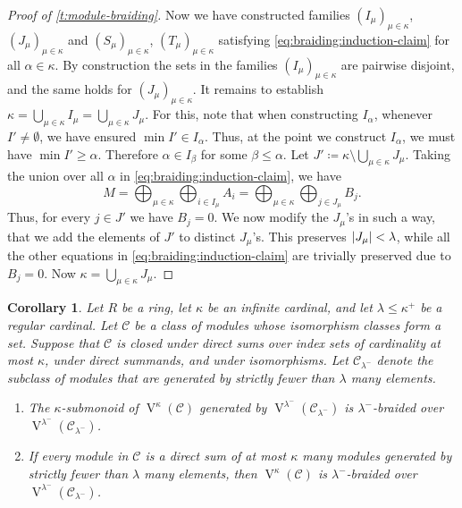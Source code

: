 \documentclass[a4paper,11pt,oneside]{amsart}
\newtheorem{cor}[teor]{Corollary}
\theoremstyle{remark}
\DeclarePairedDelimiter{\card}{\lvert}{\rvert}
\newcommand{\cC}{\mathcal C}
\DeclareMathOperator{\Vmon}{V}
\begin{document}
\begin{proof}[Proof of \cref{t:module-braiding}]
  Now we have constructed families $(I_\mu)_{\mu \in \kappa}$, $(J_\mu)_{\mu \in \kappa}$ and $(S_\mu)_{\mu \in \kappa}$, $(T_{\mu})_{\mu \in \kappa}$ satisfying \cref{eq:braiding:induction-claim} for all $\alpha \in \kappa$.
  By construction the sets in the families $(I_\mu)_{\mu \in \kappa}$ are pairwise disjoint, and the same holds for $(J_\mu)_{\mu \in \kappa}$.
  It remains to establish $\kappa = \bigcup_{\mu \in \kappa} I_\mu = \bigcup_{\mu \in \kappa} J_\mu$.
  For this, note that when constructing $I_\alpha$, whenever $I' \ne \emptyset$, we have ensured $\min I' \in I_\alpha$.
  Thus, at the point we construct $I_\alpha$, we must have $\min I' \ge \alpha$.
  Therefore $\alpha \in I_\beta$ for some $\beta \le \alpha$.
  Let $J' \coloneqq \kappa \setminus \bigcup_{\mu \in \kappa} J_\mu$.
  Taking the union over all $\alpha$ in \cref{eq:braiding:induction-claim}, we have
  \[
    M = \bigoplus_{\mu \in \kappa} \bigoplus_{i \in I_\mu} A_i = \bigoplus_{\mu \in \kappa} \bigoplus_{j \in J_\mu} B_j.
  \]
  Thus, for every $j \in J'$ we have $B_j=0$.
  We now modify the $J_\mu$'s in such a way, that we add the elements of $J'$ to distinct $J_\mu$'s.
  This preserves $\card{J_\mu} < \lambda$, while all the other equations in \cref{eq:braiding:induction-claim} are trivially preserved due to $B_j=0$.
  Now $\kappa = \bigcup_{\mu \in \kappa} J_\mu$.
\end{proof}

\begin{cor}
  Let $R$ be a ring, let $\kappa$ be an infinite cardinal, and let $\lambda \le \kappa^+$ be a regular cardinal.
  Let $\cC$ be a class of modules whose isomorphism classes form a set.
  Suppose that $\cC$ is closed under direct sums over index sets of cardinality at most $\kappa$, under direct summands, and under isomorphisms.
  Let $\cC_{\lambda^-}$ denote the subclass of modules that are generated by strictly fewer than $\lambda$ many elements.
  \begin{enumerate}
  \item The $\kappa$-submonoid of $\Vmon^{\kappa}(\cC)$ generated by $\Vmon^{\lambda^-}(\cC_{\lambda^-})$ is $\lambda^-$-braided over $\Vmon^{\lambda^-}(\cC_{\lambda^-})$.
  \item If every module in $\cC$ is a direct sum of at most $\kappa$ many modules generated by strictly fewer than $\lambda$ many elements, then  $\Vmon^{\kappa}(\cC)$ is $\lambda^-$-braided over $\Vmon^{\lambda^-}(\cC_{\lambda^-})$.
  \end{enumerate}
\end{cor}
\end{document}
